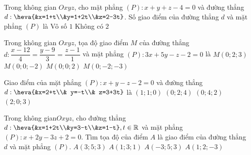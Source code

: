 \begin{ex}%
Trong không gian $Oxyz$, cho mặt phẳng $(P):x+y+z-4=0$ và đường thẳng $d:\heva{&x=1+t\\&y=1+2t\\&z=2-3t}$. Số giao điểm của đường thẳng $d$ và mặt phẳng $(P)$ là
\choice
{\True Vô số}
{$1$}
{Không có}
{$2$}
\end{ex}

\begin{ex}%
Trong không gian $Oxyz$, tọa độ giao điểm $M$ của đường thẳng $d:\dfrac{x-12}{4}=\dfrac{y-9}{3}=\dfrac{z-1}{1}$ và mặt phẳng $(P):3x+5y-z-2=0$ là
\choice
{$M(0;2;3)$}
{\True $M(0;0;-2)$}
{$M(0;0;2)$}
{$M(0;-2;-3)$}
\end{ex}

\begin{ex}%
Giao điểm của mặt phẳng $(P):x+y-z-2=0$ và đường thẳng $d:\heva{&x=2+t\\& y=-t\\& z=3+3t}$ là
\choice
{\True $(1;1;0)$}
{$(0;2;4)$}
{$(0;4;2)$}
{$(2;0;3)$}
\end{ex}

\begin{ex}%
Trong không gian$ Oxyz$, cho đường thẳng $d:\heva{&x=1+2t\\&y=3-t\\&z=1-t}, t\in\mathbb{R}$ và mặt phẳng $(P):x+2y-3z+2=0$. Tìm tọa độ của điểm $A$ là giao điểm của đường thẳng $d$ và mặt phẳng $(P)$.
\choice
{$A(3;5;3)$}
{$A(1;3;1)$}
{\True $A(-3;5;3)$}
{$A(1;2;-3)$}
\end{ex}

